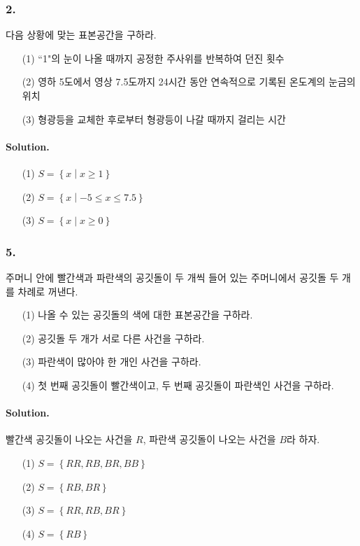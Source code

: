 \subsubsection{2.} 다음 상황에 맞는 표본공간을 구하라.
\begin{itemize}
	\item[(1)] ``1"의 눈이 나올 때까지 공정한 주사위를 반복하여 던진 횟수
	\item[(2)] 영하 5도에서 영상 7.5도까지 24시간 동안 연속적으로 기록된 온도계의 눈금의 위치
	\item[(3)] 형광등을 교체한 후로부터 형광등이 나갈 때까지 걸리는 시간
\end{itemize}

\paragraph{Solution.}
\begin{itemize}
	\item[(1)] $S = \left\{ x \middle| x \geq 1 \right\}$
	\item[(2)] $S = \left\{ x \middle| -5 \leq x \leq 7.5 \right\}$
	\item[(3)] $S = \left\{ x \middle| x \geq 0 \right\}$
\end{itemize}

\subsubsection{5.} 주머니 안에 빨간색과 파란색의 공깃돌이 두 개씩 들어 있는 주머니에서 공깃돌 두 개를 차례로 꺼낸다.
\begin{itemize}
	\item[(1)] 나올 수 있는 공깃돌의 색에 대한 표본공간을 구하라.
	\item[(2)] 공깃돌 두 개가 서로 다른 사건을 구하라.
	\item[(3)] 파란색이 많아야 한 개인 사건을 구하라.
	\item[(4)] 첫 번째 공깃돌이 빨간색이고, 두 번째 공깃돌이 파란색인 사건을 구하라.
\end{itemize}

\paragraph{Solution.} 빨간색 공깃돌이 나오는 사건을 $R$, 파란색 공깃돌이 나오는 사건을 $B$라 하자.
\begin{itemize}
	\item[(1)] $S = \left\{ RR, RB, BR, BB \right\}$
	\item[(2)] $S = \left\{ RB, BR \right\}$
	\item[(3)] $S = \left\{ RR, RB, BR \right\}$
	\item[(4)] $S = \left\{ RB \right\}$
\end{itemize}
